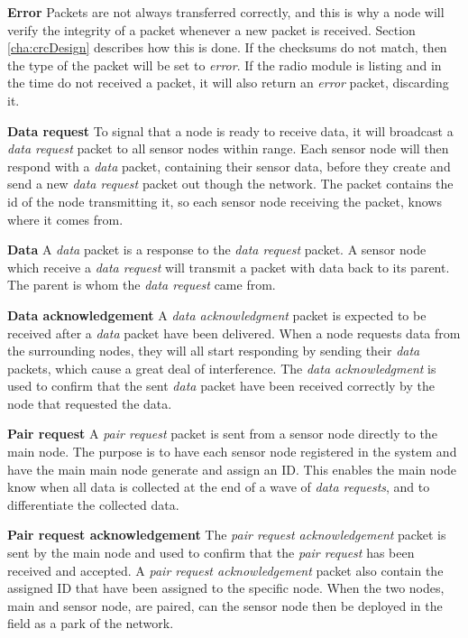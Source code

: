 \textbf{Error}\newline
Packets are not always transferred correctly, and this is why a node will verify the integrity of a packet whenever a new packet is received. Section \ref{cha:crcDesign} describes how this is done. If the checksums do not match, then the type of the packet will be set to \textit{error}. If the radio module is listing and in the time do not received a packet, it will also return an \textit{error} packet, discarding it.

\textbf{Data request}\newline %
To signal that a node is ready to receive data, it will broadcast a \textit{data request} packet to all sensor nodes within range.
Each sensor node will then respond with a \textit{data} packet, containing their sensor data, before they create and send a new \textit{data request} packet out though the network.
The packet contains the id of the node transmitting it, so each sensor node receiving the packet, knows where it comes from.

\textbf{Data}\newline
A \textit{data} packet is a response to the \textit{data request} packet.
A sensor node which receive a \textit{data request} will transmit a packet with data back to its parent.
The parent is whom the \textit{data request} came from.

\textbf{Data acknowledgement}\newline
A \textit{data acknowledgment} packet is expected to be received after a \textit{data} packet have been delivered. 
When a node requests data from the surrounding nodes, they will all start responding by sending their \textit{data} packets, which cause a great deal of interference. The \textit{data acknowledgment} is used to confirm that the sent \textit{data} packet have been received correctly by the node that requested the data.

\textbf{Pair request}\newline
A \textit{pair request} packet is sent from a sensor node directly to the main node. The purpose is to have each sensor node registered in the system and have the main main node generate and assign an ID. This enables the main node know when all data is collected at the end of a wave of \textit{data requests}, and to differentiate the collected data.

\textbf{Pair request acknowledgement}\newline
The \textit{pair request acknowledgement} packet is sent by the main node and used to confirm that the \textit{pair request} has been received and accepted. A \textit{pair request acknowledgement} packet also contain the assigned ID that have been assigned to the specific node. When the two nodes, main and sensor node, are paired, can the sensor node then be deployed in the field as a park of the network. 

